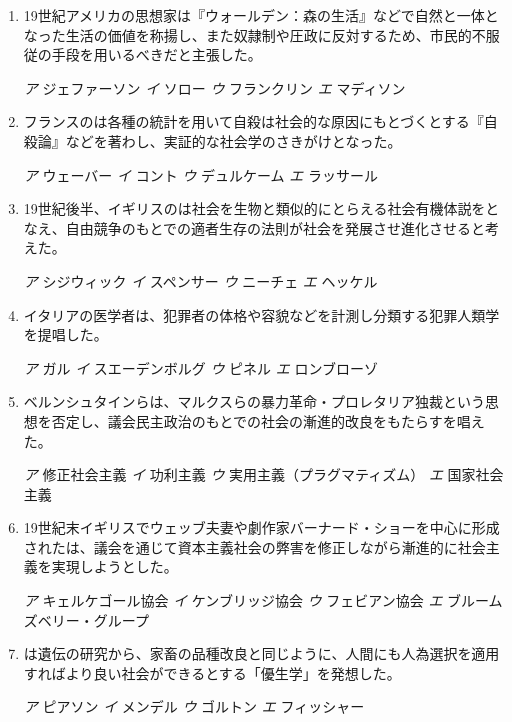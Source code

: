 \documentclass[uplatex,dvipdfmx]{jsarticle}
\newcommand{\sentakusi}[4]{
\hspace{.3zw}
\emph{ア}\hspace{1zw} #1 \hspace{2zw} \emph{イ} \hspace{1zw}#2 \hspace{2zw}\emph{ウ}\hspace{1zw} #3 \hspace{2zw}\emph{エ}\hspace{1zw} #4

}
\begin{document}
\begin{enumerate}
\sentakusi
{スティーブンソン}
{ダーウィン}
{ファラデー}
{プリーストリー}


\item   19世紀アメリカの思想家は『ウォールデン：森の生活』などで自然と一体となった生活の価値を称揚し、また奴隷制や圧政に反対するため、市民的不服従の手段を用いるべきだと主張した。

\sentakusi
{ジェファーソン}
{ソロー}
{フランクリン}
{マディソン}



\item   フランスのは各種の統計を用いて自殺は社会的な原因にもとづくとする『自殺論』などを著わし、実証的な社会学のさきがけとなった。

\sentakusi
{ウェーバー}
{コント}
{デュルケーム}
{ラッサール}


\item   19世紀後半、イギリスのは社会を生物と類似的にとらえる社会有機体説をとなえ、自由競争のもとでの適者生存の法則が社会を発展させ進化させると考えた。


\sentakusi
{シジウィック}
{スペンサー}
{ニーチェ}
{ヘッケル}

\item   イタリアの医学者は、犯罪者の体格や容貌などを計測し分類する犯罪人類学を提唱した。

\sentakusi
{ガル}
{スエーデンボルグ}
{ピネル}
{ロンブローゾ}


\item ベルンシュタインらは、マルクスらの暴力革命・プロレタリア独裁という思想を否定し、議会民主政治のもとでの社会の漸進的改良をもたらすを唱えた。

\sentakusi
{修正社会主義}
{功利主義}
{実用主義（プラグマティズム）}
{国家社会主義}


\item   19世紀末イギリスでウェッブ夫妻や劇作家バーナード・ショーを中心に形成されたは、議会を通じて資本主義社会の弊害を修正しながら漸進的に社会主義を実現しようとした。


\sentakusi
{キェルケゴール協会}
{ケンブリッジ協会}
{フェビアン協会}
{ブルームズベリー・グループ}


\item   {}は遺伝の研究から、家畜の品種改良と同じように、人間にも人為選択を適用すればより良い社会ができるとする「優生学」を発想した。

\sentakusi
{ピアソン}
{メンデル}
{ゴルトン}
{フィッシャー}




\end{enumerate}
\end{document}
